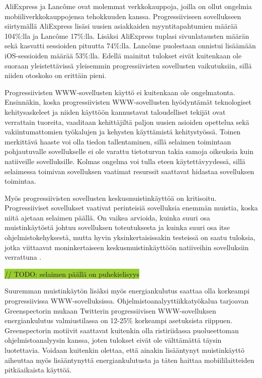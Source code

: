 \documentclass[utf8]{gradu3}
\begin{document}
AliExpress ja Lancôme ovat molemmat verkkokauppoja, joilla on ollut ongelmia mobiiliverkkokauppojensa tehokkuuden kanssa. Progressiiviseen sovellukseen siirtymällä AliExpress lisäsi uusien asiakkaiden myyntitapahtumien määrää 104\%:lla ja Lancôme 17\%:lla. Lisäksi AliExpress tuplasi sivunlatausten määrän sekä kasvatti sessioiden pituutta 74\%:lla. Lancôme puolestaan onnistui lisäämään iOS-sessioiden määrää 53\%:lla. Edellä mainitut tulokset eivät kuitenkaan ole suoraan yleistettävissä yleisemmin progressiivisten sovellusten vaikutuksiin, sillä niiden otoskoko on erittäin pieni. \parencite[]{beginners-guide-pwa}

Progressiivisten WWW-sovellusten käyttö ei kuitenkaan ole ongelmatonta. Ensinnäkin, koska progressiivisten WWW-sovellusten hyödyntämät teknologiset kehitysaskeleet ja niiden käyttöön kannustavat taloudelliset tekijät ovat verrattain tuoreita, vaaditaan kehittäjiltä paljon uusien asioiden opettelua sekä vakiintumattomien työkalujen ja kehysten käyttämistä kehitystyössä. Toinen merkittävä haaste voi olla tiedon tallentaminen, sillä selaimen toimintaan pohjautuvalle sovellukselle ei ole varattu tietoturvan takia samoja oikeuksia kuin natiiveille sovelluksille. Kolmas ongelma voi tulla eteen käytettävyydessä, sillä selaimessa toimivan sovelluksen vaatimat resurssit saattavat hidastaa sovelluksen toimintaa. \parencite[]{pwa-design-challenges}

Myös progressiivisten sovellusten keskusmuistinkäyttöä on kritisoitu. Progressiiviset sovellukset vaativat perinteisiä sovelluksia enemmän muistia, koska niitä ajetaan selaimen päällä. On vaikea arvioida, kuinka suuri osa muistinkäytöstä johtuu sovelluksen toteutuksesta ja kuinka suuri osa itse ohjelmistokehyksestä, mutta hyvin yksinkertaisissakin testeissä on saatu tuloksia, jotka viittaavat moninkertaiseen keskusmuistinkäyttöön natiiveihin sovelluksiin verrattuna \parencite[]{electron-memory-usage}.
  
\colorbox{YellowGreen}{// TODO: selaimen päällä on puhekielisyys}

Suuremman muistinkäytön lisäksi myös energiankulutus saattaa olla korkeampi progressiivissa WWW-sovelluksissa. Ohjelmistoanalyyttiikkatyökalua tarjoavan Greenspectorin mukaan \parencite[]{pwa-power-usage} Twitterin progressiivisen WWW-sovelluksen energiankulutus valmiustilassa on 12-25\% korkeampi asetuksista riippuen. Greenspectorin motiivit saattavat kuitenkin olla ristiriidassa puolueettoman ohjelmistoanalyysin kanssa, joten tulokset eivät ole välttämättä täysin luotettavia. Voidaan kuitenkin olettaa, että ainakin lisääntynyt muistinkäyttö aiheuttaa myös lisääntynyttä energiankulutusta ja täten haittaa mobiililaitteiden pitkäaikaista käyttöä.
\end{document}

